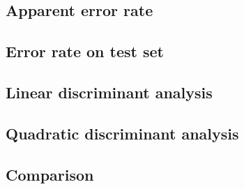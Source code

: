 \documentclass[a4paper, 12pt]{article}
\begin{document}
\subsection*{Apparent error rate}
\subsection*{Error rate on test set}
\subsection*{Linear discriminant analysis}
\subsection*{Quadratic discriminant analysis}
\subsection*{Comparison}



\clearpage
\appendix

% 
\end{document}

